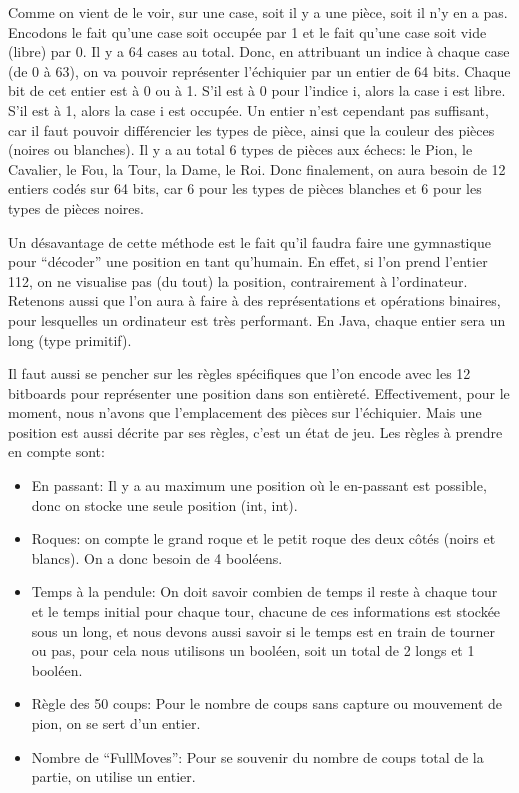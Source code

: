 \documentclass{article}
\begin{document}
Comme on vient de le voir, sur une case, soit il y a une pièce, soit il n'y en a pas.
Encodons le fait qu'une case soit occupée par 1 et le fait qu'une case soit vide (libre) par 0. Il y a 64 cases au total.
Donc, en attribuant un indice à chaque case (de 0 à 63), on va pouvoir représenter l'échiquier par un entier de 64 bits.
Chaque bit de cet entier est à 0 ou à 1. S'il est à 0 pour l'indice i, alors la case i est libre. S'il est à 1, alors la
case i est occupée. Un entier n'est cependant pas suffisant, car il faut pouvoir différencier les types de pièce, ainsi
que la couleur des pièces (noires ou blanches). Il y a au total 6 types de pièces aux échecs: le Pion, le Cavalier, le Fou,
la Tour, la Dame, le Roi. Donc finalement, on aura besoin de 12 entiers codés sur 64 bits, car 6 pour les types de pièces
blanches et 6 pour les types de pièces noires.

Un désavantage de cette méthode
est le fait qu'il faudra faire une gymnastique pour ``décoder'' une position en tant qu'humain. En effet, si l'on prend l'entier
112, on ne visualise pas (du tout) la position, contrairement à l'ordinateur.
Retenons aussi que l'on aura à faire à des représentations et opérations binaires, pour lesquelles un ordinateur est très
performant. En Java, chaque entier sera un long (type primitif).

Il faut aussi se pencher sur les règles spécifiques que l'on encode avec les 12 bitboards pour représenter une position
dans son entièreté. Effectivement, pour le moment, nous n'avons que l'emplacement des pièces sur l'échiquier. Mais une position
est aussi décrite par ses règles, c'est un état de jeu. Les règles à prendre en compte sont:\\
\begin{itemize}
   \item En passant: Il y a au maximum une position où le en-passant est possible, donc on stocke une seule position (int, int).
    \item Roques: on compte le grand roque et le petit roque des deux côtés (noirs et blancs). On a donc besoin de 4 booléens.
   \item Temps à la pendule: On doit savoir combien de temps il reste à chaque tour et le temps initial pour chaque tour, chacune de ces informations est stockée sous un long, et nous devons aussi savoir si le temps est en train de tourner ou pas, pour cela nous utilisons un booléen, soit un total de 2 longs et 1 booléen.
   \item Règle des 50 coups: Pour le nombre de coups sans capture ou mouvement de pion, on se sert d’un entier.
   \item Nombre de ``FullMoves'': Pour se souvenir du nombre de coups total de la partie, on utilise un entier.\\
\end{itemize}
\end{document}
